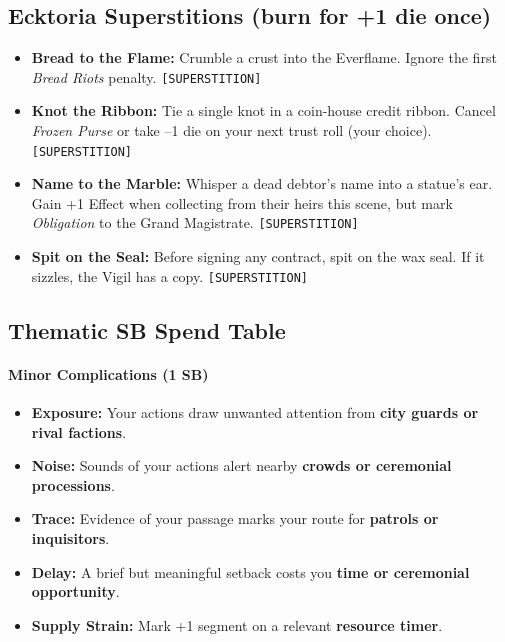 \subsection*{Ecktoria Superstitions (burn for +1 die once)}
\begin{itemize}
  \item \textbf{Bread to the Flame:} Crumble a crust into the Everflame. Ignore the first \emph{Bread Riots} penalty. \texttt{[SUPERSTITION]}
  \item \textbf{Knot the Ribbon:} Tie a single knot in a coin-house credit ribbon. Cancel \emph{Frozen Purse} or take --1 die on your next trust roll (your choice). \texttt{[SUPERSTITION]}
  \item \textbf{Name to the Marble:} Whisper a dead debtor's name into a statue's ear. Gain +1 Effect when collecting from their heirs this scene, but mark \emph{Obligation} to the Grand Magistrate. \texttt{[SUPERSTITION]}
  \item \textbf{Spit on the Seal:} Before signing any contract, spit on the wax seal. If it sizzles, the Vigil has a copy. \texttt{[SUPERSTITION]}
\end{itemize}

\subsection*{Thematic SB Spend Table}
\label{sec:ecktoria-sb}

\paragraph{Minor Complications (1 SB)}
\begin{itemize}
\item \textbf{Exposure:} Your actions draw unwanted attention from \textbf{city guards or rival factions}.
\item \textbf{Noise:} Sounds of your actions alert nearby \textbf{crowds or ceremonial processions}.
\item \textbf{Trace:} Evidence of your passage marks your route for \textbf{patrols or inquisitors}.
\item \textbf{Delay:} A brief but meaningful setback costs you \textbf{time or ceremonial opportunity}.
\item \textbf{Supply Strain:} Mark +1 segment on a relevant \textbf{resource timer}.
\end{itemize}

